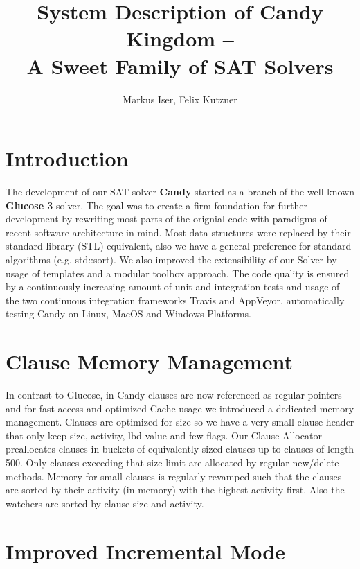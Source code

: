 \documentclass{llncs}
\title{System Description of Candy Kingdom --\\ A Sweet Family of SAT Solvers}
\author{Markus Iser, Felix Kutzner}
\institute{
  Karlsruhe Institute of Technology (KIT), Germany\\
  \url{{markus.iser, felix.kutzner}@kit.edu}
}
\begin{document}
\maketitle

\begin{abstract}

\end{abstract}

\section{Introduction}

The development of our SAT solver \textbf{Candy} started as a branch of the well-known \textbf{Glucose 3} solver.
The goal was to create a firm foundation for further development by rewriting most parts of the orignial code with paradigms of recent software architecture in mind.
Most data-structures were replaced by their standard library (STL) equivalent, also we have a general preference for standard algorithms (e.g. std::sort).
We also improved the extensibility of our Solver by usage of templates and a modular toolbox approach.
The code quality is ensured by a continuously increasing amount of unit and integration tests and usage of the two continuous integration frameworks Travis and AppVeyor, automatically testing Candy on Linux, MacOS and Windows Platforms.

\section{Clause Memory Management}
\label{sec:clauses}

In contrast to Glucose, in Candy clauses are now referenced as regular pointers and for fast access and optimized Cache usage we introduced a dedicated memory management. Clauses are optimized for size so we have a very small clause header that only keep size, activity, lbd value and few flags. Our Clause Allocator preallocates clauses in buckets of equivalently sized clauses up to clauses of length 500. Only clauses exceeding that size limit are allocated by regular new/delete methods. Memory for small clauses is regularly revamped such that the clauses are sorted by their activity (in memory) with the highest activity first. Also the watchers are sorted by clause size and activity. 

\section{Improved Incremental Mode}
\end{document}
